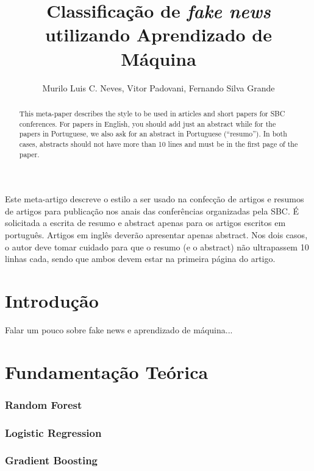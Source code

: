 \documentclass[12pt]{article}
\title{Classificação de \textit{fake news} utilizando Aprendizado de Máquina}
\author{Murilo Luis C. Neves\inst{1}, Vitor Padovani\inst{1}, Fernando Silva Grande\inst{1}}
\begin{document}
 

\maketitle

\begin{abstract}
  This meta-paper describes the style to be used in articles and short papers
  for SBC conferences. For papers in English, you should add just an abstract
  while for the papers in Portuguese, we also ask for an abstract in
  Portuguese (``resumo''). In both cases, abstracts should not have more than
  10 lines and must be in the first page of the paper.
\end{abstract}
     
\begin{resumo} 
  Este meta-artigo descreve o estilo a ser usado na confecção de artigos e
  resumos de artigos para publicação nos anais das conferências organizadas
  pela SBC. É solicitada a escrita de resumo e abstract apenas para os artigos
  escritos em português. Artigos em inglês deverão apresentar apenas abstract.
  Nos dois casos, o autor deve tomar cuidado para que o resumo (e o abstract)
  não ultrapassem 10 linhas cada, sendo que ambos devem estar na primeira
  página do artigo.
\end{resumo}

\section{Introdução}

Falar um pouco sobre fake news e aprendizado de máquina...

\section{Fundamentação Teórica}

\subsubsection{Random Forest}

\subsubsection{Logistic Regression}

\subsubsection{Gradient Boosting}
\end{document}
